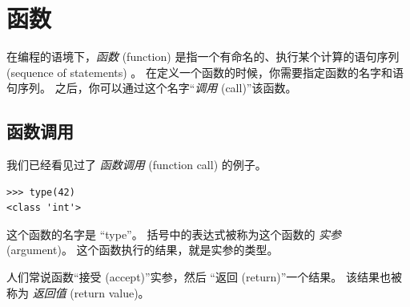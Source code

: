 

\chapter{函数}
\label{funcchap}


在编程的语境下，{\em 函数} (function)  是指一个有命名的、执行某个计算的语句序列(sequence of statements) 。  在定义一个函数的时候，你需要指定函数的名字和语句序列。  之后，你可以通过这个名字``{\em 调用} (call)''该函数。
  

%
\section{函数调用}
\label{functionchap}


我们已经看见过了 {\em 函数调用} (function call) 的例子。

\begin{lstlisting}
>>> type(42)
<class 'int'>
\end{lstlisting}

%

这个函数的名字是 ``type''。 括号中的表达式被称为这个函数的 {\em 实参} (argument)。 这个函数执行的结果，就是实参的类型。


人们常说函数``接受 (accept)''实参，然后 ``返回 (return)''一个结果。
该结果也被称为 {\em 返回值} (return value)。
  
  

